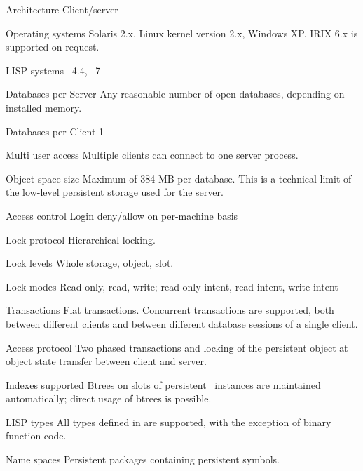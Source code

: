 %
\begin{deflist}[XXXXXXXXXXXXXXX]

\item[Architecture] Client/server

\item[Operating systems] Solaris 2.x, Linux kernel version 2.x,
  Windows XP. IRIX 6.x is  supported on request.

\item[LISP systems] \href{http://www.lispworks.com}{\lwcl}\ 4.4,
  \href{http://www.franz.coml}{\allegrocl}\ 7

\item[Databases per Server] Any reasonable number of open databases,
  depending on installed memory.

\item[Databases per Client] 1

\item[Multi user access] Multiple clients can connect to one server
  process.

\item[Object space size] Maximum of 384 MB per database. This is a
  technical limit of the low-level persistent storage used for the
  server.

\item[Access control] Login deny/allow on per-machine basis

\item[Lock protocol] Hierarchical locking.

\item[Lock levels] Whole storage, object, slot.

\item[Lock modes] Read-only, read, write; read-only intent, read
  intent, write intent

\item[Transactions] Flat transactions. Concurrent transactions are
  supported, both between different clients and between different
  database sessions of a single client.

\item[Access protocol] Two phased transactions and locking of the
  persistent object at object state transfer between client and
  server.

\item[Indexes supported] Btrees on slots of persistent \clos\ 
  instances are maintained automatically; direct usage of btrees is
  possible.

\item[LISP types] All types defined in \cite{bib:CLtLII} are
  supported, with the exception of binary function code.

\item[Name spaces] Persistent packages containing persistent symbols.

\end{deflist}
